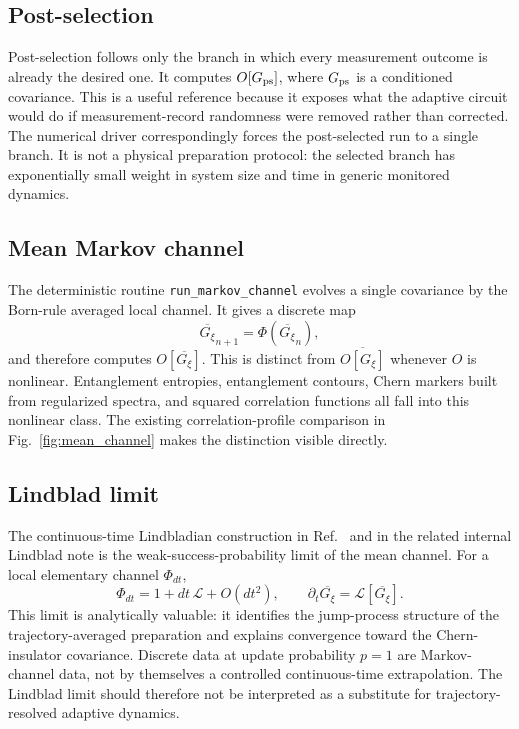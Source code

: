 \documentclass[aps,twocolumn,floatfix,superscriptaddress,nofootinbib]{revtex4-2}
\newcommand{\avg}[1]{\overline{#1}}
\newcommand{\Gtraj}{G_{\xi}}
\newcommand{\Gps}{G_{\rm ps}}
\newcommand{\Gbar}{\overline{G_{\xi}}}
\newcommand{\calL}{\mathcal{L}}
\begin{document}
\subsection{Post-selection}

Post-selection follows only the branch in which every measurement outcome is already the
desired one.  It computes $O[\Gps]$, where $\Gps$ is a conditioned covariance.  This is a
useful reference because it exposes what the adaptive circuit would do if measurement-record
randomness were removed rather than corrected.  The numerical driver correspondingly forces
the post-selected run to a single branch.  It is not a physical preparation protocol: the
selected branch has exponentially small weight in system size and time in generic monitored
dynamics.

\subsection{Mean Markov channel}

The deterministic routine \texttt{run\_markov\_channel} evolves a single covariance by the
Born-rule averaged local channel.  It gives a discrete map
\begin{equation}
  \Gbar_{n+1} = \Phi(\Gbar_n),
\end{equation}
and therefore computes $O[\Gbar]$.  This is distinct from $\avg{O[\Gtraj]}$ whenever
$O$ is nonlinear.  Entanglement entropies, entanglement contours, Chern markers built from
regularized spectra, and squared correlation functions all fall into this nonlinear class.
The existing correlation-profile comparison in Fig.~\ref{fig:mean_channel} makes the
distinction visible directly.

\subsection{Lindblad limit}

The continuous-time Lindbladian construction in Ref.~\cite{BhuiyanPanJian2026} and in the
related internal Lindblad note is the weak-success-probability limit of the mean channel.
For a local elementary channel $\Phi_{dt}$,
\begin{equation}
  \Phi_{dt} = 1 + dt\,\calL + O(dt^2),
  \qquad
  \partial_t \Gbar = \calL[\Gbar].
  \label{eq:lindblad_limit}
\end{equation}
This limit is analytically valuable: it identifies the jump-process structure of the
trajectory-averaged preparation and explains convergence toward the Chern-insulator
covariance.  Discrete data at update probability $p=1$ are Markov-channel data, not by
themselves a controlled continuous-time extrapolation.  The Lindblad limit should therefore
not be interpreted as a substitute for trajectory-resolved adaptive dynamics.
\end{document}
